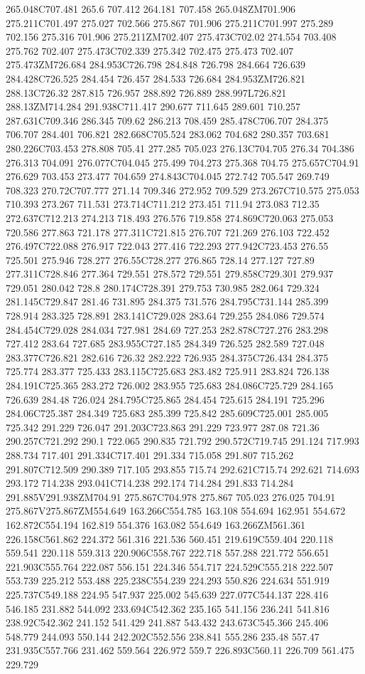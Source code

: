 265.048C707.481 265.6 707.412 264.181 707.458 265.048ZM701.906 275.211C701.497 275.027 702.566 275.867 701.906 275.211C701.997 275.289 702.156 275.316 701.906 275.211ZM702.407 275.473C702.02 274.554 703.408 275.762 702.407 275.473C702.339 275.342 702.475 275.473 702.407 275.473ZM726.684 284.953C726.798 284.848 726.798 284.664 726.639 284.428C726.525 284.454 726.457 284.533 726.684 284.953ZM726.821 288.13C726.32 287.815 726.957 288.892 726.889 288.997L726.821 288.13ZM714.284 291.938C711.417 290.677 711.645 289.601 710.257 287.631C709.346 286.345 709.62 286.213 708.459 285.478C706.707 284.375 706.707 284.401 706.821 282.668C705.524 283.062 704.682 280.357 703.681 280.226C703.453 278.808 705.41 277.285 705.023 276.13C704.705 276.34 704.386 276.313 704.091 276.077C704.045 275.499 704.273 275.368 704.75 275.657C704.91 276.629 703.453 273.477 704.659 274.843C704.045 272.742 705.547 269.749 708.323 270.72C707.777 271.14 709.346 272.952 709.529 273.267C710.575 275.053 710.393 273.267 711.531 273.714C711.212 273.451 711.94 273.083 712.35 272.637C712.213 274.213 718.493 276.576 719.858 274.869C720.063 275.053 720.586 277.863 721.178 277.311C721.815 276.707 721.269 276.103 722.452 276.497C722.088 276.917 722.043 277.416 722.293 277.942C723.453 276.55 725.501 275.946 728.277 276.55C728.277 276.865 728.14 277.127 727.89 277.311C728.846 277.364 729.551 278.572 729.551 279.858C729.301 279.937 729.051 280.042 728.8 280.174C728.391 279.753 730.985 282.064 729.324 281.145C729.847 281.46 731.895 284.375 731.576 284.795C731.144 285.399 728.914 283.325 728.891 283.141C729.028 283.64 729.255 284.086 729.574 284.454C729.028 284.034 727.981 284.69 727.253 282.878C727.276 283.298 727.412 283.64 727.685 283.955C727.185 284.349 726.525 282.589 727.048 283.377C726.821 282.616 726.32 282.222 726.935 284.375C726.434 284.375 725.774 283.377 725.433 283.115C725.683 283.482 725.911 283.824 726.138 284.191C725.365 283.272 726.002 283.955 725.683 284.086C725.729 284.165 726.639 284.48 726.024 284.795C725.865 284.454 725.615 284.191 725.296 284.06C725.387 284.349 725.683 285.399 725.842 285.609C725.001 285.005 725.342 291.229 726.047 291.203C723.863 291.229 723.977 287.08 721.36 290.257C721.292 290.1 722.065 290.835 721.792 290.572C719.745 291.124 717.993 288.734 717.401 291.334C717.401 291.334 715.058 291.807 715.262 291.807C712.509 290.389 717.105 293.855 715.74 292.621C715.74 292.621 714.693 293.172 714.238 293.041C714.238 292.174 714.284 291.833 714.284 291.885V291.938ZM704.91 275.867C704.978 275.867 705.023 276.025 704.91 275.867V275.867ZM554.649 163.266C554.785 163.108 554.694 162.951 554.672 162.872C554.194 162.819 554.376 163.082 554.649 163.266ZM561.361 226.158C561.862 224.372 561.316 221.536 560.451 219.619C559.404 220.118 559.541 220.118 559.313 220.906C558.767 222.718 557.288 221.772 556.651 221.903C555.764 222.087 556.151 224.346 554.717 224.529C555.218 222.507 553.739 225.212 553.488 225.238C554.239 224.293 550.826 224.634 551.919 225.737C549.188 224.95 547.937 225.002 545.639 227.077C544.137 228.416 546.185 231.882 544.092 233.694C542.362 235.165 541.156 236.241 541.816 238.92C542.362 241.152 541.429 241.887 543.432 243.673C545.366 245.406 548.779 244.093 550.144 242.202C552.556 238.841 555.286 235.48 557.47 231.935C557.766 231.462 559.564 226.972 559.7 226.893C560.11 226.709 561.475 229.729 
